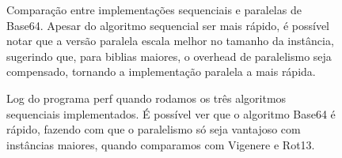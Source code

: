 \documentclass[12pt]{article}
\begin{document}
\begin{figure}[H]
    \caption{Comparação entre implementações sequenciais e paralelas de
        Base64. Apesar do algoritmo sequencial ser mais rápido, é 
        possível notar que a versão paralela escala melhor no tamanho da
        instância, sugerindo que, para biblias maiores, o overhead de
        paralelismo seja compensado, tornando a implementação paralela
        a mais rápida.}
    \label{fig:base64_parallelseq}
\end{figure}

\begin{figure}[H]
    \caption{Log do programa perf quando rodamos os três algoritmos 
    sequenciais implementados. É possível ver que o algoritmo Base64 é 
    rápido, fazendo com que o paralelismo só seja vantajoso com 
    instâncias maiores, quando comparamos com Vigenere e Rot13.}
    \label{fig:base64_seq_perf}
\end{figure}
\end{document}
